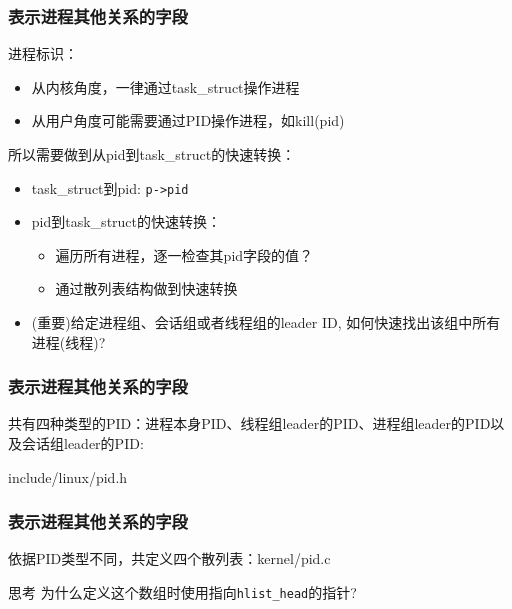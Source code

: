 \documentclass[xcolor=svgnames]{beamer}
\begin{document}
\begin{CJK*}{UTF8}{gbsn}
\begin{frame}[fragile]
\frametitle{表示进程其他关系的字段}
进程标识：

\begin{itemize}
\item 从内核角度，一律通过task\_struct操作进程
\item 从用户角度可能需要通过PID操作进程，如kill(pid)
\end{itemize}

所以需要做到从pid到task\_struct的快速转换：

\begin{itemize}
\item task\_struct到pid: \verb|p->pid|
\item pid到task\_struct的快速转换：
\begin{itemize}
\item 遍历所有进程，逐一检查其pid字段的值？
\item 通过散列表结构做到快速转换
\end{itemize}
\item (重要)给定进程组、会话组或者线程组的leader ID, 如何快速找出该组中所有进程(线程)?
\end{itemize}

\end{frame}

\begin{frame}[fragile]
\frametitle{表示进程其他关系的字段}
共有四种类型的PID：进程本身PID、线程组leader的PID、进程组leader的PID以及会话组leader的PID:
\begin{block}{include/linux/pid.h}
\lstpidtype
\end{block}
\end{frame}

\begin{frame}[fragile]
\frametitle{表示进程其他关系的字段}
\begin{block}{依据PID类型不同，共定义四个散列表：kernel/pid.c}
\lstpidhashhaha
\end{block}
\begin{block}{思考}
为什么定义这个数组时使用指向\verb|hlist_head|的指针?
\end{block}
\end{frame}


\end{CJK*}
\end{document}

